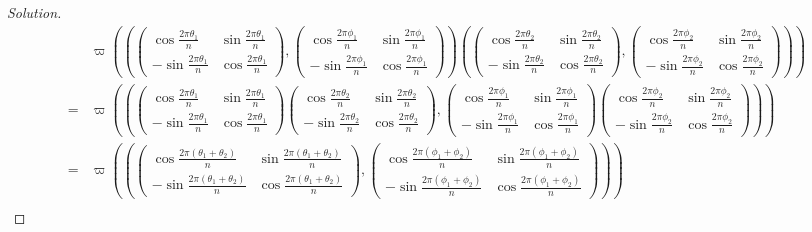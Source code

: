 \documentclass{article}
\theoremstyle{definition}
\theoremstyle{plain}
\begin{document}
\begin{adjustwidth}{0.7cm}{}
\begin{proof}[Solution]
\begin{align*}
&\varpi\left(\left(\begin{pmatrix}\cos\frac{2\pi\theta_1}{n}&\sin\frac{2\pi\theta_1}{n}\\ -\sin\frac{2\pi\theta_1}{n}&\cos\frac{2\pi\theta_1}{n}\end{pmatrix},\begin{pmatrix}\cos\frac{2\pi\phi_1}{n}&\sin\frac{2\pi\phi_1}{n}\\ -\sin\frac{2\pi\phi_1}{n}&\cos\frac{2\pi\phi_1}{n}\end{pmatrix}\right)\left(\begin{pmatrix}\cos\frac{2\pi\theta_2}{n}&\sin\frac{2\pi\theta_2}{n}\\ -\sin\frac{2\pi\theta_2}{n}&\cos\frac{2\pi\theta_2}{n}\end{pmatrix},\begin{pmatrix}\cos\frac{2\pi\phi_2}{n}&\sin\frac{2\pi\phi_2}{n}\\ -\sin\frac{2\pi\phi_2}{n}&\cos\frac{2\pi\phi_2}{n}\end{pmatrix}\right)\right)\\
=&\varpi\left(\left(\begin{pmatrix}\cos\frac{2\pi\theta_1}{n}&\sin\frac{2\pi\theta_1}{n}\\ -\sin\frac{2\pi\theta_1}{n}&\cos\frac{2\pi\theta_1}{n}\end{pmatrix}\begin{pmatrix}\cos\frac{2\pi\theta_2}{n}&\sin\frac{2\pi\theta_2}{n}\\ -\sin\frac{2\pi\theta_2}{n}&\cos\frac{2\pi\theta_2}{n}\end{pmatrix},\begin{pmatrix}\cos\frac{2\pi\phi_1}{n}&\sin\frac{2\pi\phi_1}{n}\\ -\sin\frac{2\pi\phi_1}{n}&\cos\frac{2\pi\phi_1}{n}\end{pmatrix}\begin{pmatrix}\cos\frac{2\pi\phi_2}{n}&\sin\frac{2\pi\phi_2}{n}\\ -\sin\frac{2\pi\phi_2}{n}&\cos\frac{2\pi\phi_2}{n}\end{pmatrix}\right)\right)\\
=&\varpi\left(\left(\begin{pmatrix}\cos\frac{2\pi(\theta_1+\theta_2)}{n}&\sin\frac{2\pi(\theta_1+\theta_2)}{n}\\ -\sin\frac{2\pi(\theta_1+\theta_2)}{n}&\cos\frac{2\pi(\theta_1+\theta_2)}{n}\end{pmatrix},\begin{pmatrix}\cos\frac{2\pi(\phi_1+\phi_2)}{n}&\sin\frac{2\pi(\phi_1+\phi_2)}{n}\\ -\sin\frac{2\pi(\phi_1+\phi_2)}{n}&\cos\frac{2\pi(\phi_1+\phi_2)}{n}\end{pmatrix}\right)\right)\\

\end{align*}
\end{proof}
\end{adjustwidth}
\end{document}
